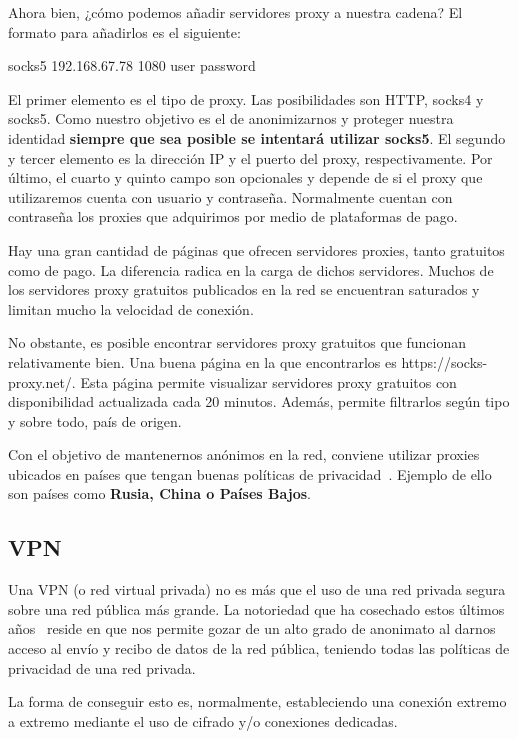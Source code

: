 Ahora bien, ¿cómo podemos añadir servidores proxy a nuestra cadena?
El formato para añadirlos es el siguiente:


{\selectfont 
	socks5  192.168.67.78   1080    user   password
}

El primer elemento es el tipo de proxy. Las posibilidades son HTTP, socks4 y socks5. Como nuestro objetivo es el de anonimizarnos y proteger nuestra identidad \textbf{siempre que sea posible se intentará utilizar socks5}.
El segundo y tercer elemento es la dirección IP y el puerto del proxy, respectivamente. 
Por último, el cuarto y quinto campo son opcionales y depende de si el proxy que utilizaremos cuenta con usuario y contraseña. Normalmente cuentan con contraseña los proxies que adquirimos por medio de plataformas de pago.

Hay una gran cantidad de páginas que ofrecen servidores proxies, tanto gratuitos como de pago. La diferencia radica en la carga de dichos servidores. Muchos de los servidores proxy gratuitos publicados en la red se encuentran saturados y limitan mucho la velocidad de conexión.

No obstante, es posible encontrar servidores proxy gratuitos que funcionan relativamente bien. Una buena página en la que encontrarlos es https://socks-proxy.net/. 
Esta página permite visualizar servidores proxy gratuitos con disponibilidad actualizada cada 20 minutos. Además, permite filtrarlos según tipo y sobre todo, país de origen.

Con el objetivo de mantenernos anónimos en la red, conviene utilizar proxies ubicados en países que tengan buenas políticas de privacidad~\cite{article:politicas}. Ejemplo de ello son países como \textbf{Rusia, China o Países Bajos}.

\subsection{VPN}

Una VPN (o red virtual privada) no es más que el uso de una red privada segura sobre una red pública más grande. 
La notoriedad que ha cosechado estos últimos años~\cite{article:notoriedad} reside en que nos permite gozar de un alto grado de anonimato al darnos acceso al envío y recibo de datos de la red pública, teniendo todas las políticas de privacidad de una red privada.

La forma de conseguir esto es, normalmente, estableciendo una conexión extremo a extremo mediante el uso de cifrado y/o conexiones dedicadas.

